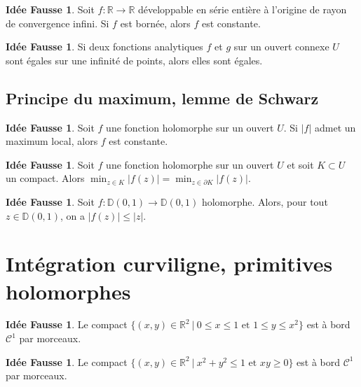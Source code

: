 \documentclass[11pt,a4paper]{article}
\newcommand{\D}{\mathbb{D}}
\newcommand{\R}{\mathbb{R}}
\theoremstyle{definition}
\newtheorem{ideeFausse}[theoreme]{Idée Fausse}
\theoremstyle{plain}
\begin{document}
\begin{ideeFausse}
Soit $f : \R\to \R$ développable en série entière à l'origine de rayon de convergence infini. Si $f$ est bornée, alors $f$ est constante.
\end{ideeFausse}

\begin{ideeFausse}
Si deux fonctions analytiques $f$ et $g$ sur un ouvert connexe $U$ sont égales sur une infinité de points, alors elles sont égales.
\end{ideeFausse}

\subsection{Principe du maximum, lemme de Schwarz}

\begin{ideeFausse}
Soit $f$ une fonction holomorphe sur un ouvert $U$.
Si $|f|$ admet un maximum local, alors $f$ est constante.
\end{ideeFausse}


\begin{ideeFausse}
Soit $f$ une fonction holomorphe sur un ouvert $U$ et soit $K\subset U$ un compact.
Alors $\min_{z\in K} |f(z)| = \min_{z\in \partial K} |f(z)|$.
\end{ideeFausse}






\begin{ideeFausse}
Soit $f : \D(0,1)\to \D(0,1)$ holomorphe.
Alors, pour tout $z\in \D(0,1)$, on a $|f(z)| \leq |z|$.
\end{ideeFausse}



%
%



\section{Intégration curviligne, primitives holomorphes}


\begin{ideeFausse}
Le compact $\{(x,y)\in \R^2\:|\: 0\leq x \leq 1 \text{ et }1 \leq y \leq x^2\}$ est à bord $\mathcal C^1$ par morceaux.
\end{ideeFausse}

\begin{ideeFausse}
Le compact $\{(x,y)\in \R^2\:|\: x^2+y^2\leq 1 \text{ et } xy\geq 0\}$ est à bord $\mathcal C^1$ par morceaux.
\end{ideeFausse}
\end{document}
